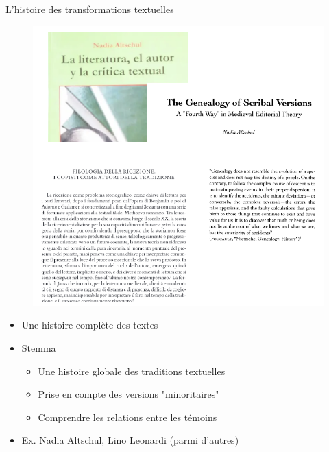 \documentclass[11pt]{beamer}
\begin{document}
\begin{frame}{L'histoire des transformations textuelles}

\begin{minipage}{.45\textwidth}


    \begin{figure}
        \centering
        \includegraphics[width=1.2\linewidth]{img/scribal_versionism.png}
    \end{figure}
    \end{minipage}%
    \hfill
    \begin{minipage}{.45\textwidth}

    \begin{itemize}
    \item Une histoire complète des textes
    \item Stemma
    \begin{itemize}
        \item Une histoire globale des traditions textuelles
        \item Prise en compte des versions "minoritaires"
        \item Comprendre les relations entre les témoins
    \end{itemize}
    \item Ex. Nadia Altschul, Lino Leonardi (parmi d'autres)
    \end{itemize}
    \end{minipage}
    
\end{frame}
\end{document}
